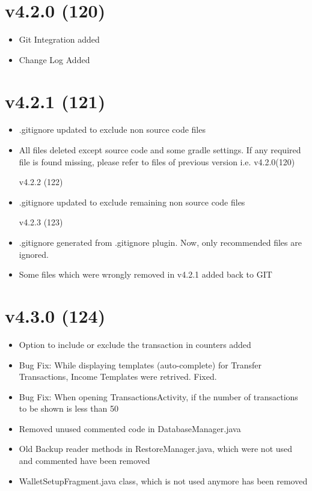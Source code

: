\documentclass{article}
\begin{document}
\section{v4.2.0 (120)}
\begin{itemize}
\item Git Integration added
\item Change Log Added
\end{itemize}

\section{v4.2.1 (121)}
\begin{itemize}
\item .gitignore updated to exclude non source code files
\item All files deleted except source code and some gradle settings. If any required file is found missing, please refer to files of previous version i.e. v4.2.0(120)
 
v4.2.2 (122)
\item .gitignore updated to exclude remaining non source code files
 
v4.2.3 (123)
\item .gitignore generated from .gitignore plugin. Now, only recommended files are ignored. 
\item Some files which were wrongly removed in v4.2.1 added back to GIT
\end{itemize}

\section{v4.3.0 (124)}
\begin{itemize}
\item Option to include or exclude the transaction in counters added
\item Bug Fix: While displaying templates (auto-complete) for Transfer Transactions, Income Templates were retrived. Fixed.
\item Bug Fix: When opening TransactionsActivity, if the number of transactions to be shown is less than 50
\item Removed unused commented code in DatabaseManager.java
\item Old Backup reader methods in RestoreManager.java, which were not used and commented have been removed
\item WalletSetupFragment.java class, which is not used anymore has been removed
\end{itemize}
\end{document}
